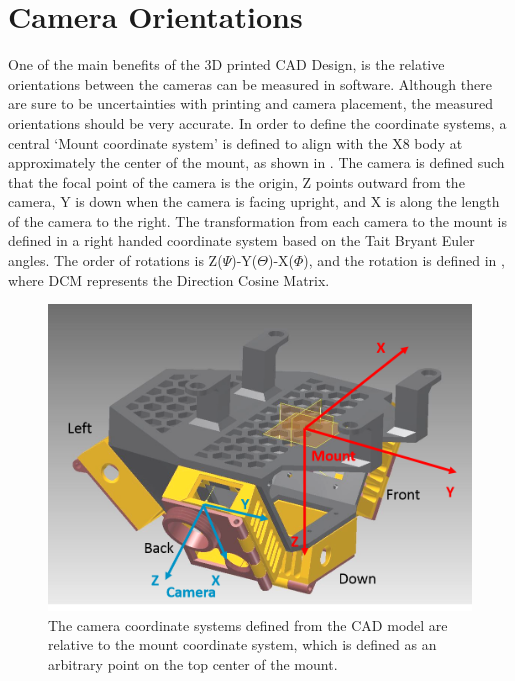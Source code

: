 	\section{Camera Orientations}
	One of the main benefits of the 3D printed CAD Design, is the relative orientations between the cameras can be measured in software.  Although there are sure to be uncertainties with printing and camera placement, the measured orientations should be very accurate.  In order to define the coordinate systems, a central `Mount coordinate system' is defined to align with the X8 body at approximately the center of the mount, as shown in .  The camera is defined such that the focal point of the camera is the origin, Z points outward from the camera, Y is down when the camera is facing upright, and X is along the length of the camera to the right.  The transformation from each camera to the mount is defined in a right handed coordinate system based on the Tait Bryant Euler angles.  The order of rotations is Z($\Psi$)-Y($\Theta$)-X($\Phi$), and the rotation is defined in , where DCM represents the Direction Cosine Matrix.
	
	\begin{figure}[H]
		\centering
		\includegraphics[scale = 0.4]{../figures/orient.png}
		\caption{The camera coordinate systems defined from the CAD model are relative to the mount coordinate system, which is defined as an arbitrary point on the top center of the mount.}
		\label{fig:orient}
	\end{figure}
	
